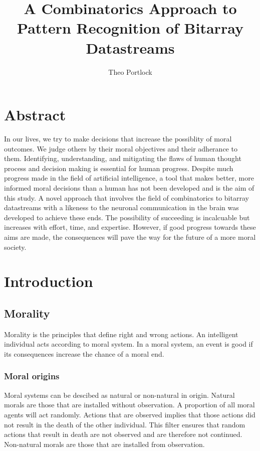 \documentclass{book}
\title{A Combinatorics Approach to Pattern Recognition of Bitarray Datastreams}
\author{Theo Portlock}
\begin{document}
\frontmatter
\maketitle

\chapter{Abstract}
In our lives, we try to make decisions that increase the possiblity of moral outcomes.
We judge others by their moral objectives and their adherance to them.
Identifying, understanding, and mitigating the flaws of human thought process and decision making is essential for human progress.
Despite much progress made in the field of artificial intelligence, a tool that makes better, more informed moral decisions than a human has not been developed and is the aim of this study.
A novel approach that involves the field of combinatorics to bitarray datastreams with a likeness to the neuronal communication in the brain was developed to achieve these ends.
The possibility of succeeding is incalcuable but increases with effort, time, and expertise.
However, if good progress towards these aims are made, the consequences will pave the way for the future of a more moral society.

\cleardoublepage
{}
{}
\tableofcontents

\cleardoublepage
{}
{}
\listoffigures

\cleardoublepage
{}
{}
\listoftables

\mainmatter
\chapter{Introduction}
\section{Morality}
Morality is the principles that define right and wrong actions.
An intelligent individual acts according to moral system.
In a moral system, an event is good if its consequences increase the chance of a moral end.

\subsection{Moral origins}
Moral systems can be descibed as natural or non-natural in origin.
Natural morals are those that are installed without observation.
A proportion of all moral agents will act randomly.
Actions that are observed implies that those actions did not result in the death of the other individual.
This filter ensures that random actions that result in death are not observed and are therefore not continued.
Non-natural morals are those that are installed from observation.
\end{document}

